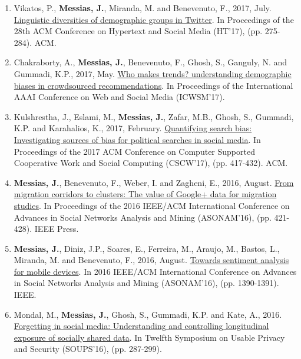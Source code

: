 \begin{enumerate}
    \item Vikatos, P., \textbf{Messias, J.}, Miranda, M. and Benevenuto, F., 2017, July. \href{https://people.mpi-sws.org/~johnme/pdf/vikatos_ht17_linguistic-diversity.pdf}{Linguistic diversities of demographic groups in Twitter}. In Proceedings of the 28th ACM Conference on Hypertext and Social Media (HT'17), (pp. 275-284). ACM.
    \item Chakraborty, A., \textbf{Messias, J.}, Benevenuto, F., Ghosh, S., Ganguly, N. and Gummadi, K.P., 2017, May. \href{https://people.mpi-sws.org/~johnme/pdf/chakraborty_icwsm17_who_makes_trends.pdf}{Who makes trends? understanding demographic biases in crowdsourced recommendations}. In Proceedings of the International AAAI Conference on Web and Social Media (ICWSM'17).
    \item Kulshrestha, J., Eslami, M., \textbf{Messias, J.}, Zafar, M.B., Ghosh, S., Gummadi, K.P. and Karahalios, K., 2017, February. \href{https://people.mpi-sws.org/~johnme/pdf/kulshrestha_cscw17_search_bias.pdf}{Quantifying search bias: Investigating sources of bias for political searches in social media}. In Proceedings of the 2017 ACM Conference on Computer Supported Cooperative Work and Social Computing (CSCW'17), (pp. 417-432). ACM.
    \item \textbf{Messias, J.}, Benevenuto, F., Weber, I. and Zagheni, E., 2016, August. \href{https://people.mpi-sws.org/~johnme/pdf/messias_asonam16_migration.pdf}{From migration corridors to clusters: The value of Google+ data for migration studies}. In Proceedings of the 2016 IEEE/ACM International Conference on Advances in Social Networks Analysis and Mining (ASONAM'16), (pp. 421-428). IEEE Press.
    \item \textbf{Messias, J.}, Diniz, J.P., Soares, E., Ferreira, M., Araujo, M., Bastos, L., Miranda, M. and Benevenuto, F., 2016, August. \href{https://people.mpi-sws.org/~johnme/pdf/messias_asonam16_mobile.pdf}{Towards sentiment analysis for mobile devices}. In 2016 IEEE/ACM International Conference on Advances in Social Networks Analysis and Mining (ASONAM'16), (pp. 1390-1391). IEEE.
    \item Mondal, M., \textbf{Messias, J.}, Ghosh, S., Gummadi, K.P. and Kate, A., 2016. \href{https://people.mpi-sws.org/~johnme/pdf/mainack_soups16.pdf}{Forgetting in social media: Understanding and controlling longitudinal exposure of socially shared data}. In Twelfth Symposium on Usable Privacy and Security (SOUPS'16), (pp. 287-299).

\end{enumerate}
